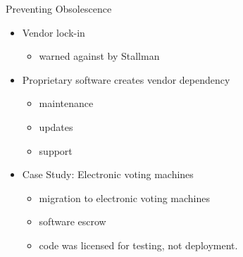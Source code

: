 


\begin{frame}{Preventing Obsolescence}
  \begin{itemize}

    \item Vendor lock-in
      \begin{itemize}
        \item warned against by Stallman \citeyear[para. 54]{rms2011}
      \end{itemize}
    \item Proprietary software creates vendor dependency
      \begin{itemize}
        \item maintenance
        \item updates
        \item support
      \end{itemize}
    \item Case Study: Electronic voting machines \cite[p. 916]{colannino}
      \begin{itemize}
        \item migration to electronic voting machines
        \item software escrow
        \item code was licensed for testing, not deployment.
      \end{itemize}
  \end{itemize}
\end{frame}


